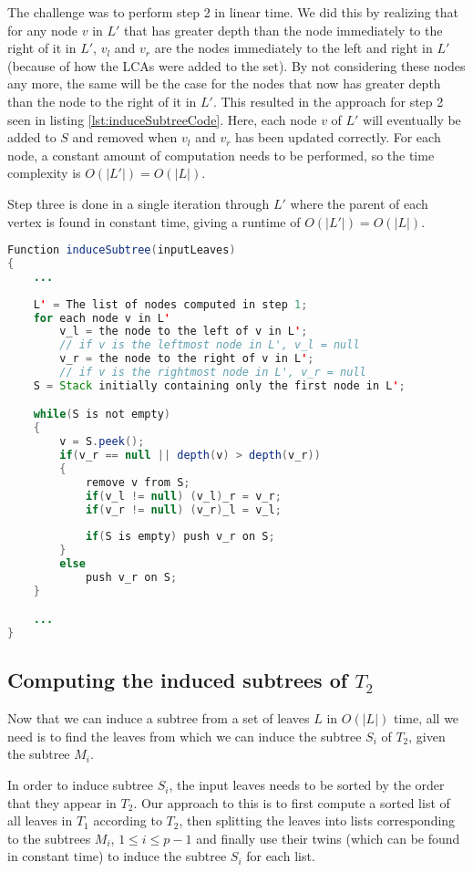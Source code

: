The challenge was to perform step 2 in linear time. We did this by realizing that for any node $v$ in $L'$ that has greater depth than the node immediately to the right of it in $L'$, $v_l$ and $v_r$ are the nodes immediately to the left and right in $L'$ (because of how the LCAs were added to the set). By not considering these nodes any more, the same will be the case for the nodes that now has greater depth than the node to the right of it in $L'$. This resulted in the approach for step 2 seen in listing \ref{lst:induceSubtreeCode}. Here, each node $v$ of $L'$ will eventually be added to $S$ and removed when $v_l$ and $v_r$ has been updated correctly. For each node, a constant amount of computation needs to be performed, so the time complexity is $O(|L'|) = O(|L|)$.

Step three is done in a single iteration through $L'$ where the parent of each vertex is found in constant time, giving a runtime of $O(|L'|) = O(|L|)$.

\begin{lstlisting}[language=Java, caption=Step 2 of induceSubtree, label={lst:induceSubtreeCode}]
Function induceSubtree(inputLeaves)
{
	...
	
	L' = The list of nodes computed in step 1;
	for each node v in L'
		v_l = the node to the left of v in L';
		// if v is the leftmost node in L', v_l = null
		v_r = the node to the right of v in L';
		// if v is the rightmost node in L', v_r = null
	S = Stack initially containing only the first node in L';

	while(S is not empty)
	{
		v = S.peek();
		if(v_r == null || depth(v) > depth(v_r))
		{
			remove v from S;
			if(v_l != null) (v_l)_r = v_r;
			if(v_r != null) (v_r)_l = v_l;
			
			if(S is empty) push v_r on S;
		}
		else
			push v_r on S;
	}

	...
}
\end{lstlisting}

\subsection{Computing the induced subtrees of $T_2$}
Now that we can induce a subtree from a set of leaves $L$ in $O(|L|)$ time, all we need is to find the leaves from which we can induce the subtree $S_i$ of $T_2$, given the subtree $M_i$.

In order to induce subtree $S_i$, the input leaves needs to be sorted by the order that they appear in $T_2$. Our approach to this is to first compute a sorted list of all leaves in $T_1$ according to $T_2$, then splitting the leaves into lists corresponding to the subtrees $M_i$, $1 \le i \le p-1$ and finally use their twins (which can be found in constant time) to induce the subtree $S_i$ for each list.

